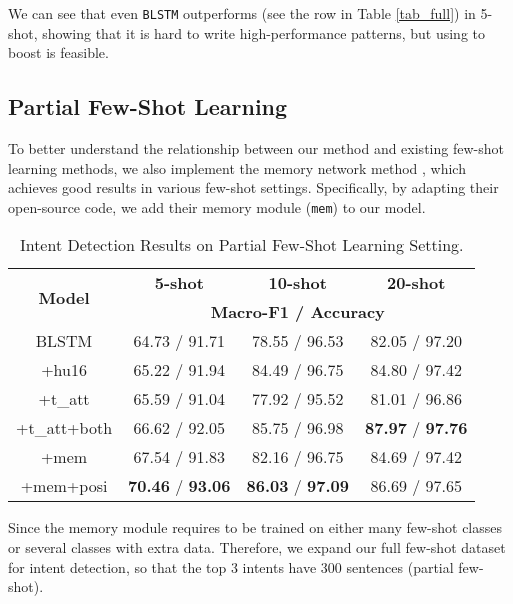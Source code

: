 We can see that even \texttt{BLSTM} outperforms \RE (see the \RE row in Table \ref{tab_full}) in 5-shot, showing that it is hard to write high-performance \RE patterns, but using \RE to boost \NN is feasible.


\subsection{Partial Few-Shot Learning}
To better understand the relationship between our method and existing few-shot learning methods, we also implement the memory network method \cite{kaiser2017learning}, which achieves good results in various few-shot settings. Specifically, by adapting their open-source code, we add their memory module (\texttt{mem}) to our \BLSTM model.

\begin{table}
\setlength{\tabcolsep}{0.23em}
\centering
\small{
\begin{tabular}{|c|c|c|c|}

\hline
\multirow{2}{*}{\textbf{Model}}  & \multicolumn{1}{|c|}{\textbf{5-shot}} & \multicolumn{1}{|c|}{\textbf{10-shot}} & \multicolumn{1}{|c|}{\textbf{20-shot}}  \\
\cline{2-4}
 & \multicolumn{3}{|c|}{\textbf{Macro-F1 / Accuracy}}   \\
\hline
\rowcolor{Gray} BLSTM & 64.73 / 91.71 & 78.55 / 96.53 & 82.05 / 97.20 \\
\hline
+hu16 & 65.22 / 91.94 & 84.49 / 96.75 & 84.80 / 97.42 \\
\hline
\rowcolor{Gray} +t\_att & 65.59 / 91.04 & 77.92 / 95.52 & 81.01 / 96.86 \\
\hline
+t\_att+both & 66.62 / 92.05 & 85.75 / 96.98 & \textbf{87.97} / \textbf{97.76} \\
\hline
\rowcolor{Gray} +mem & 67.54 / 91.83 & 82.16 / 96.75 & 84.69 / 97.42 \\
\hline
+mem+posi & \textbf{70.46} / \textbf{93.06} & \textbf{86.03} / \textbf{97.09} & 86.69 / 97.65 \\
\hline

\end{tabular}
}
\caption{Intent Detection Results on Partial Few-Shot Learning Setting.}
\label{tab_intent_few_fill}
\end{table}

Since the memory module requires to be trained on either many few-shot classes or several classes with extra data.
Therefore, we expand our full few-shot dataset for intent detection, so that the top 3 intents have 300 sentences (partial few-shot).

